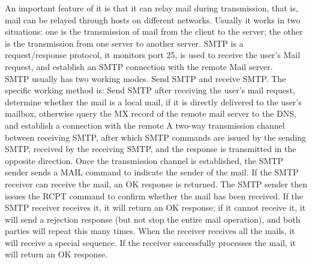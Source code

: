 An important feature of it is that it can relay mail during transmission, that is, mail can be relayed through hosts on different networks. Usually it works in two situations: one is the transmission of mail from the client to the server; the other is the transmission from one server to another server. SMTP is a request/response protocol, it monitors port 25, is used to receive the user's Mail request, and establish an SMTP connection with the remote Mail server.
\\
SMTP usually has two working modes. Send SMTP and receive SMTP. The specific working method is: Send SMTP after receiving the user's mail request, determine whether the mail is a local mail, if it is directly delivered to the user's mailbox, otherwise query the MX record of the remote mail server to the DNS, and establish a connection with the remote A two-way transmission channel between receiving SMTP, after which SMTP commands are issued by the sending SMTP, received by the receiving SMTP, and the response is transmitted in the opposite direction. Once the transmission channel is established, the SMTP sender sends a MAIL command to indicate the sender of the mail. If the SMTP receiver can receive the mail, an OK response is returned. The SMTP sender then issues the RCPT command to confirm whether the mail has been received. If the SMTP receiver receives it, it will return an OK response; if it cannot receive it, it will send a rejection response (but not stop the entire mail operation), and both parties will repeat this many times. When the receiver receives all the mails, it will receive a special sequence. If the receiver successfully processes the mail, it will return an OK response.
\\


